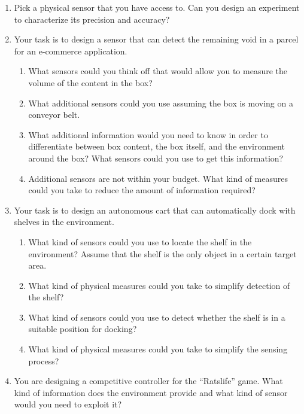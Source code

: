 \begin{enumerate}
\item Pick a physical sensor that you have access to. Can you design an experiment to characterize its precision and accuracy?
\item Your task is to design a sensor that can detect the remaining void in a parcel for an e-commerce application.
\begin{enumerate}
\item What sensors could you think off that would allow you to measure the volume of the content in the box?
\item What additional sensors could you use assuming the box is moving on a conveyor belt.
\item What additional information would you need to know in order to differentiate between box content, the box itself, and the environment around the box? What sensors could you use to get this information?
\item Additional sensors are not within your budget. What kind of measures could you take to reduce the amount of information required?
\end{enumerate}
\item Your task is to design an autonomous cart that can automatically dock with shelves in the environment.
\begin{enumerate}
\item What kind of sensors could you use to locate the shelf in the environment? Assume that the shelf is the only object in a certain target area.
\item What kind of physical measures could you take to simplify detection of the shelf?
\item  What kind of sensors could you use to detect whether the shelf is in a suitable position for docking?
\item What kind of physical measures could you take to simplify the sensing process?
\end{enumerate}
\item You are designing a competitive controller for the ``Ratslife'' game. What kind of information does the environment provide and what kind of sensor would you need to exploit it?
\end{enumerate}\normalsize
